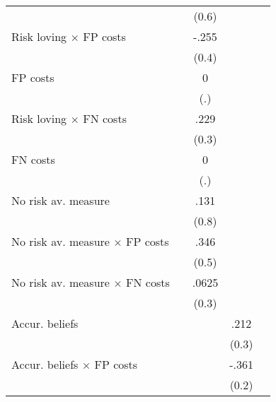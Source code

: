\begin{table}[htbp]
\begin{tabular}{l*{4}{c}}
                &                  &    (0.6)         &                  &                  \\
Risk loving $\times$ FP costs&                  &    -.255         &                  &                  \\
                &                  &    (0.4)         &                  &                  \\
FP costs        &                  &        0         &                  &                  \\
                &                  &      (.)         &                  &                  \\
Risk loving $\times$ FN costs&                  &     .229         &                  &                  \\
                &                  &    (0.3)         &                  &                  \\
FN costs        &                  &        0         &                  &                  \\
                &                  &      (.)         &                  &                  \\
No risk av. measure&                  &     .131         &                  &                  \\
                &                  &    (0.8)         &                  &                  \\
No risk av. measure $\times$ FP costs&                  &     .346         &                  &                  \\
                &                  &    (0.5)         &                  &                  \\
No risk av. measure $\times$ FN costs&                  &    .0625         &                  &                  \\
                &                  &    (0.3)         &                  &                  \\
Accur. beliefs  &                  &                  &     .212         &                  \\
                &                  &                  &    (0.3)         &                  \\
Accur. beliefs $\times$ FP costs&                  &                  &    -.361         &                  \\
                &                  &                  &    (0.2)         &                  \\

\end{tabular}
\end{table}
